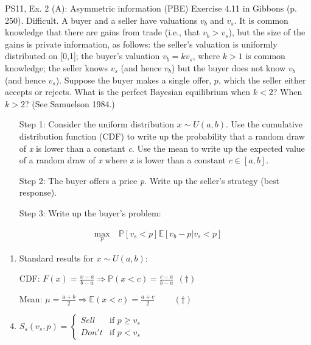 \begin{frame}{PS11, Ex. 2 (A): Asymmetric information (PBE)}
    Exercise 4.11 in Gibbons (p. 250). Difficult. A buyer and a seller have valuations $v_b$ and $v_s$. It is common knowledge that there are gains from trade (i.e., that $v_b > v_s$), but the size of the gains is private information, as follows: the seller’s valuation is uniformly distributed on [0,1]; the buyer’s valuation $v_b = kv_s$, where $k > 1$ is common knowledge; the seller knows $v_s$ (and hence $v_b$) but the buyer does not know $v_b$ (and hence $v_s$). Suppose the buyer makes a single offer, $p$, which the seller either accepts or rejects. What is the perfect Bayesian equilibrium when $k < 2$? When $k > 2$? (See Samuelson 1984.) \vspace{-8pt}
    \begin{multicols}{2}
      \begin{itemize}
        \item[Step 1:] Consider the uniform distribution $x\sim U(a, b)$. Use the cumulative distribution function (CDF) to write up the probability that a random draw of \textit{x} is lower than a constant \textit{c}. Use the mean to write up the expected value of a random draw of \textit{x} where \textit{x} is lower than a constant $c\in[a,b]$.
        \item[Step 2:] The buyer offers a price \textit{p}. Write up the seller's strategy (best response).
        \item[Step 3:] Write up the buyer's problem:
      \end{itemize} \vspace{-8pt}
      \begin{align*}
        \displaystyle{\max_p}&\ \mathbb{P}[v_s<p]\mathbb{E}[v_b-p|v_s<p]
      \end{align*}
      \vfill\null\columnbreak
      \begin{enumerate}
        \item Standard results for $x\sim U(a, b):$
        \item[CDF:] $F(x)=\frac{x-a}{b-a}\Rightarrow\mathbb{P}(x<c)=\frac{c-a}{b-a}\ \ (\dagger)$
        \item[Mean:] $\mu=\frac{a+b}{2}\Rightarrow\mathbb{E}(x<c)=\frac{a+c}{2}\quad\quad\ (\ddagger)$
        \item $S_s(v_s,p)=\left\{\begin{array}{ll}
          Sell  & \text{if }p\geq v_s \\
          Don't & \text{if }p < v_s
        \end{array}\right.$
      \end{enumerate}
      \vfill\null
    \end{multicols}
\end{frame}
